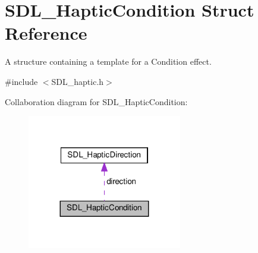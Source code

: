 \hypertarget{structSDL__HapticCondition}{}\section{S\+D\+L\+\_\+\+Haptic\+Condition Struct Reference}
\label{structSDL__HapticCondition}


A structure containing a template for a Condition effect.  




{\ttfamily \#include $<$S\+D\+L\+\_\+haptic.\+h$>$}



Collaboration diagram for S\+D\+L\+\_\+\+Haptic\+Condition\+:\nopagebreak
\begin{figure}[H]
\begin{center}
\leavevmode
\includegraphics[width=191pt]{structSDL__HapticCondition__coll__graph}
\end{center}
\end{figure}
